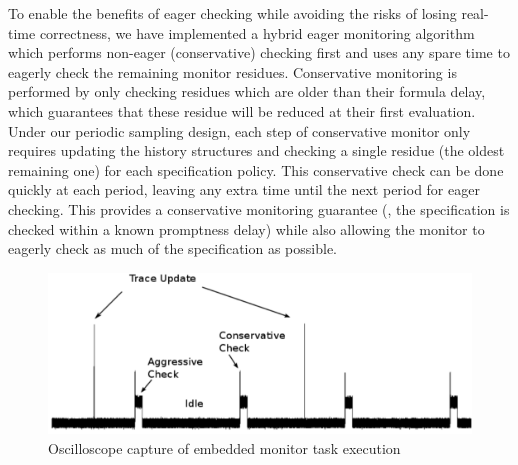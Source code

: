 To enable the benefits of eager checking while avoiding the risks of losing real-time correctness, we have implemented a hybrid eager monitoring algorithm which performs non-eager (conservative) checking first and uses any spare time to eagerly check the remaining monitor residues.
%
Conservative \monitor monitoring is performed by only checking residues which are older than their formula delay, which guarantees that these residue will be reduced at their first evaluation.
%
Under our periodic sampling design, each step of conservative monitor only requires updating the history structures and checking a single residue (the oldest remaining one) for each specification policy.
%
This conservative check can be done quickly at each period, leaving any extra time until the next period for eager checking. This provides a conservative monitoring guarantee (\ie, the specification is checked within a known promptness delay) while also allowing the monitor to eagerly check as much of the specification as possible.


\begin{figure}[t]
\includegraphics[width=4.5in]{img/scope_annotated_crop}
\caption{Oscilloscope capture of embedded monitor task execution \label{fig:arch:oscope}}
\end{figure}

